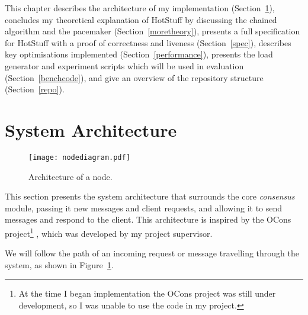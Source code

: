This chapter describes the architecture of my implementation (Section~\ref{architecture}), concludes my theoretical explanation of HotStuff by discussing the chained algorithm and the pacemaker (Section~\ref{moretheory}), presents a full specification for HotStuff with a proof of correctness and liveness (Section~\ref{spec}), describes key optimisations implemented (Section~\ref{performance}), presents the load generator and experiment scripts which will be used in evaluation (Section~\ref{benchcode}), and give an overview of the repository structure (Section~\ref{repo}).

\section{System Architecture} \label{architecture}

\begin{figure}[h!]
\centering
\texttt{[image: nodediagram.pdf]}
\caption{Architecture of a node.}
\label{nodediagram}
\end{figure}

This section presents the system architecture that surrounds the core \textit{consensus} module, passing it new messages and client requests, and allowing it to send messages and respond to the client. This architecture is inspired by the OCons project\footnote{At the time I began implementation the OCons project was still under development, so I was unable to use the code in my project.} \cite{ocons}, which was developed by my project supervisor.

We will follow the path of an incoming request or message travelling through the system, as shown in Figure~\ref{nodediagram}.

